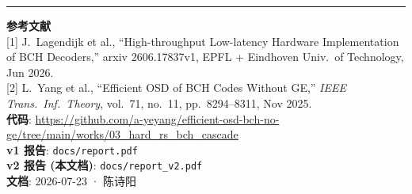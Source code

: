 \documentclass[11pt,a4paper]{article}
\begin{document}
\vspace{6pt}
\hrule
\vspace{4pt}
\noindent\footnotesize{
\textbf{参考文献}\\
{[1]} J.\ Lagendijk et al., ``High-throughput Low-latency Hardware Implementation of BCH Decoders,''
arxiv 2606.17837v1, EPFL + Eindhoven Univ.\ of Technology, Jun 2026.\\
{[2]} L.\ Yang et al., ``Efficient OSD of BCH Codes Without GE,''
{\it IEEE Trans.\ Inf.\ Theory}, vol.\ 71, no.\ 11, pp.\ 8294--8311, Nov 2025.\\
\textbf{代码}: \url{https://github.com/a-yeyang/efficient-osd-bch-no-ge/tree/main/works/03_hard_rs_bch_cascade}\\
\textbf{v1 报告}: \texttt{docs/report.pdf}\\
\textbf{v2 报告 (本文档)}: \texttt{docs/report\_v2.pdf}\\
\textbf{文档}: 2026-07-23 · 陈诗阳
}
\end{document}
